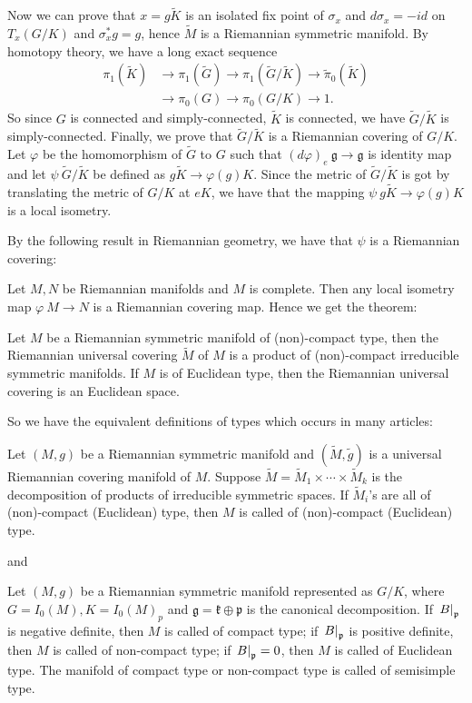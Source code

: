Now we can prove that $x = g \tilde{K}$ is an isolated fix point
of $\sigma_{x}$ and $d \sigma_{x} = -i d$ on $T_{x}(G / K)$ and
$\sigma_{x}^{*} g = g$, hence $\tilde{M}$ is a Riemannian
symmetric manifold. By homotopy theory, we have a long exact
sequence
\[
\begin{aligned}
	\pi_{1}(\tilde{K}) & \rightarrow \pi_{1}(\tilde{G})
	\rightarrow \pi_{1}(\tilde{G} / \tilde{K}) \rightarrow
	\tilde{\pi}_{0}(\tilde{K}) \\
	& \rightarrow \pi_{0}(G) \rightarrow \pi_{0}(G / K)
	\rightarrow 1.
\end{aligned}
\]
So since $G$ is connected and simply-connected, $\tilde{K}$ is
connected, we have $\tilde{G} / \tilde{K}$ is simply-connected.
Finally, we prove that $\tilde{G} / \tilde{K}$ is a Riemannian
covering of $G / K$. Let $\varphi$ be the homomorphism of
$\tilde{G}$ to $G$ such that $(d \varphi)_{e}\: \mathfrak{g}
\rightarrow \mathfrak{g}$ is identity map and let $\psi\:
\tilde{G} / \tilde{K}$ be defined as $g \tilde{K} \rightarrow
\varphi(g) K$.
Since the metric of $\tilde{G} / \tilde{K}$ is got by
translating the metric of $G / K$ at $e K$, we have that the
mapping $\psi\: g \tilde{K} \rightarrow \varphi(g) K$ is a local
isometry.

By the following result in Riemannian geometry, we have that
$\psi$ is a Riemannian covering:

 Let $M, N$ be Riemannian manifolds and $M$ is complete. Then
 any local
isometry map $\varphi\: M \rightarrow N$ is a Riemannian
covering map.
\eproof
Hence we get the theorem:
\begin{theorem}
	Let $M$ be a Riemannian symmetric manifold of (non)-compact
	type, then the Riemannian universal covering $\tilde{M}$ of
	$M$ is a product of (non)-compact irreducible symmetric
	manifolds. If $M$ is of Euclidean type, then the Riemannian
	universal covering is an Euclidean space.
\end{theorem}

So we have the equivalent definitions of types which occurs in
many articles:

\begin{definition}
	Let $(M, g)$ be a Riemannian symmetric manifold and
	$(\tilde{M}, \tilde{g})$ is a universal Riemannian covering
	manifold of $M$. Suppose $\tilde M = \tilde M_{1} \times
	\cdots \times \tilde M_{k}$ is the decomposition of products
	of irreducible symmetric spaces. If $\tilde M_{i}$'s are
	all of (non)-compact (Euclidean) type, then $M$ is called of
	(non)-compact
	(Euclidean) type.
\end{definition}
and
\begin{definition}
	Let $(M, g)$ be a Riemannian symmetric manifold represented
	as $G / K$, where $G = I_{0}(M), K = I_0(M)_p$ and
	$\mathfrak{g} = \mathfrak{k}\oplus\mathfrak{p}$ is the
	canonical decomposition. If $\left.B\right|_{{\mathfrak p}}$ is
	negative definite, then $M$ is called of compact type; if
	$\left.B\right|_{{\mathfrak p}}$ is positive definite, then $M$ is
	called of non-compact type; if $\left.B\right|_{{\mathfrak p}} = 0$,
	then $M$ is called of Euclidean type. The manifold of
	compact type or non-compact type is called of semisimple
	type.
\end{definition}

